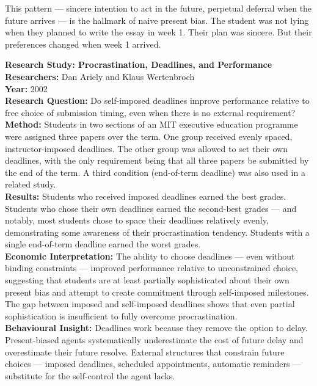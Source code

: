 \documentclass[12pt, letterpaper]{article}
\begin{document}
This pattern --- sincere intention to act in the future, perpetual deferral when the future arrives --- is the hallmark of naive present bias. The student was not lying when they planned to write the essay in week 1. Their plan was sincere. But their preferences changed when week 1 arrived.

\begin{researchbox}
\textbf{Research Study: Procrastination, Deadlines, and Performance}\\[4pt]

\textbf{Researchers:} Dan Ariely and Klaus Wertenbroch\\[4pt]
\textbf{Year:} 2002\\[4pt]
\textbf{Research Question:} Do self-imposed deadlines improve performance relative to free choice of submission timing, even when there is no external requirement?\\[4pt]
\textbf{Method:} Students in two sections of an MIT executive education programme were assigned three papers over the term. One group received evenly spaced, instructor-imposed deadlines. The other group was allowed to set their own deadlines, with the only requirement being that all three papers be submitted by the end of the term. A third condition (end-of-term deadline) was also used in a related study.\\[4pt]
\textbf{Results:} Students who received imposed deadlines earned the best grades. Students who chose their own deadlines earned the second-best grades --- and notably, most students chose to space their deadlines relatively evenly, demonstrating some awareness of their procrastination tendency. Students with a single end-of-term deadline earned the worst grades.\\[4pt]
\textbf{Economic Interpretation:} The ability to choose deadlines --- even without binding constraints --- improved performance relative to unconstrained choice, suggesting that students are at least partially sophisticated about their own present bias and attempt to create commitment through self-imposed milestones. The gap between imposed and self-imposed deadlines shows that even partial sophistication is insufficient to fully overcome procrastination.\\[4pt]
\textbf{Behavioural Insight:} Deadlines work because they remove the option to delay. Present-biased agents systematically underestimate the cost of future delay and overestimate their future resolve. External structures that constrain future choices --- imposed deadlines, scheduled appointments, automatic reminders --- substitute for the self-control the agent lacks.\\[4pt]
\end{researchbox}
\end{document}
